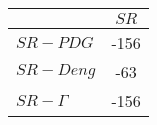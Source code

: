 \begin{tabular}{l|c}
\toprule
{} &  $SR$ \\
\midrule
\textbf{$SR-PDG$   } &  -156 \\
\textbf{$SR-Deng$  } &   -63 \\
\textbf{$SR-\Gamma$} &  -156 \\
\bottomrule
\end{tabular}
